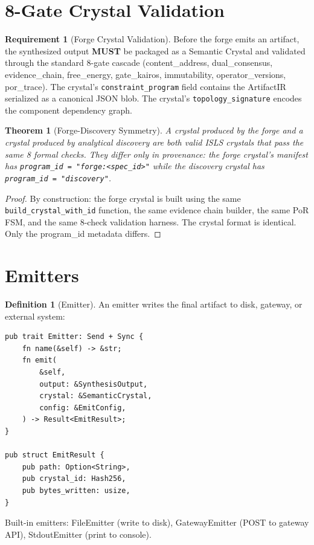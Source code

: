 \documentclass[11pt,a4paper,twoside]{article}
\theoremstyle{definition}
\newtheorem{definition}{Definition}[section]
\newtheorem{requirement}{Requirement}[section]
\theoremstyle{plain}
\newtheorem{theorem}{Theorem}[section]
\theoremstyle{remark}
\newcommand{\ISLS}{\textsf{ISLS}}
\begin{document}
\section{8-Gate Crystal Validation}\label{sec:forge:validate}

\begin{requirement}[Forge Crystal Validation]\label{req:forgeval}
Before the forge emits an artifact, the synthesized output
\textbf{MUST} be packaged as a Semantic Crystal and validated through
the standard 8-gate cascade (content\_address, dual\_consensus,
evidence\_chain, free\_energy, gate\_kairos, immutability,
operator\_versions, por\_trace). The crystal's
\texttt{constraint\_program} field contains the ArtifactIR serialized
as a canonical JSON blob. The crystal's \texttt{topology\_signature}
encodes the component dependency graph.
\end{requirement}

\begin{theorem}[Forge-Discovery Symmetry]\label{thm:forgesym}
A crystal produced by the forge and a crystal produced by analytical
discovery are both valid \ISLS{} crystals that pass the same 8 formal
checks. They differ only in provenance: the forge crystal's manifest
has \texttt{program\_id = "forge:<spec\_id>"} while the discovery
crystal has \texttt{program\_id = "discovery"}.
\end{theorem}

\begin{proof}
By construction: the forge crystal is built using the same
\texttt{build\_crystal\_with\_id} function, the same evidence chain
builder, the same PoR FSM, and the same 8-check validation harness.
The crystal format is identical. Only the program\_id metadata
differs.
\end{proof}


\section{Emitters}\label{sec:forge:emit}

\begin{definition}[Emitter]\label{def:emitter}
An emitter writes the final artifact to disk, gateway, or external
system:
\begin{lstlisting}
pub trait Emitter: Send + Sync {
    fn name(&self) -> &str;
    fn emit(
        &self,
        output: &SynthesisOutput,
        crystal: &SemanticCrystal,
        config: &EmitConfig,
    ) -> Result<EmitResult>;
}

pub struct EmitResult {
    pub path: Option<String>,
    pub crystal_id: Hash256,
    pub bytes_written: usize,
}
\end{lstlisting}
Built-in emitters: FileEmitter (write to disk), GatewayEmitter (POST
to gateway API), StdoutEmitter (print to console).
\end{definition}
\end{document}
